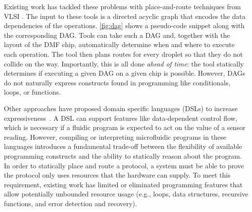 \documentclass[sigplan, screen]{acmart}
\begin{document}
Existing work has tackled these problems with place-and-route techniques from VLSI
\cite{bohringer2006parallel, grissom2012scheduling, yao2016contamination, zhao2012contamination, huang2010contamination, keszocze2015routing, roy2010routing, grissom2014interpreting}.
The input to these tools is a directed acyclic graph that encodes the data dependencies of the operations.
\autoref{fig:dag} shows a pseudo-code snippet along with the corresponding DAG.
Tools can take such a DAG and, together with the layout of the DMF chip, automatically determine when and where to execute each operation.
The tool then plans routes for every droplet so that they do not collide on the way.
Importantly, this is all done \emph{ahead of time}:
the tool statically determines if executing a given DAG on a given chip is possible.
However, DAGs do not naturally express constructs found in programming like conditionals, loops, or functions.

Other approaches have proposed domain specific languages (DSLs) to increase expressiveness~\cite{grissom2015open, grissom2014interpreting, curtis2018compiler, ott2018bioscript, biocoder}.
A DSL can support features like data-dependent control flow, which is necessary if a fluidic program is expected to act on the value of a sensor reading.
However, compiling or interpreting microfluidic programs in these languages introduces a fundamental trade-off between the flexibility of available programming constructs and the ability to statically reason about the program.
In order to statically place and route a protocol, a system must be able to prove the protocol only uses resources that the hardware can supply.
To meet this requirement, existing work has limited or eliminated programming features that allow potentially unbounded resource usage (e.g., loops, data structures, recursive functions, and error detection and recovery).
\end{document}
